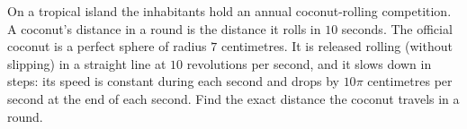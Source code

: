 On a tropical island the inhabitants hold an annual coconut-rolling competition. A coconut's distance in a round is the distance it rolls in $10$ seconds. The official coconut is a perfect sphere of radius $7$ centimetres. It is released rolling (without slipping) in a straight line at $10$ revolutions per second, and it slows down in steps: its speed is constant during each second and drops by $10\pi$ centimetres per second at the end of each second. Find the exact distance the coconut travels in a round.
